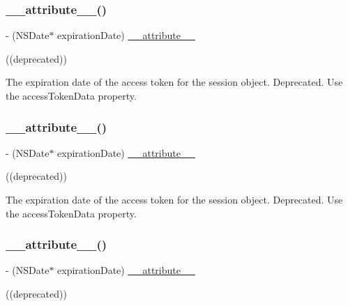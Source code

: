 \subsubsection{\texorpdfstring{\+\_\+\+\_\+attribute\+\_\+\+\_\+()}{\_\_attribute\_\_()}\hspace{0.1cm}{\footnotesize\ttfamily [8/25]}}
{\footnotesize\ttfamily -\/ (N\+S\+Date$\ast$ expiration\+Date) \hyperlink{struct____attribute____}{\+\_\+\+\_\+attribute\+\_\+\+\_\+} \begin{DoxyParamCaption}\item[{((deprecated))}]{ }\end{DoxyParamCaption}}

The expiration date of the access token for the session object.  Deprecated. Use the {\ttfamily access\+Token\+Data} property. \mbox{\label{interfaceFBSession_a42e6a02db4caa8197e8fc851bc18f1e1}} 
\subsubsection{\texorpdfstring{\+\_\+\+\_\+attribute\+\_\+\+\_\+()}{\_\_attribute\_\_()}\hspace{0.1cm}{\footnotesize\ttfamily [9/25]}}
{\footnotesize\ttfamily -\/ (N\+S\+Date$\ast$ expiration\+Date) \hyperlink{struct____attribute____}{\+\_\+\+\_\+attribute\+\_\+\+\_\+} \begin{DoxyParamCaption}\item[{((deprecated))}]{ }\end{DoxyParamCaption}}

The expiration date of the access token for the session object.  Deprecated. Use the {\ttfamily access\+Token\+Data} property. \mbox{\label{interfaceFBSession_a42e6a02db4caa8197e8fc851bc18f1e1}} 
\subsubsection{\texorpdfstring{\+\_\+\+\_\+attribute\+\_\+\+\_\+()}{\_\_attribute\_\_()}\hspace{0.1cm}{\footnotesize\ttfamily [10/25]}}
{\footnotesize\ttfamily -\/ (N\+S\+Date$\ast$ expiration\+Date) \hyperlink{struct____attribute____}{\+\_\+\+\_\+attribute\+\_\+\+\_\+} \begin{DoxyParamCaption}\item[{((deprecated))}]{ }\end{DoxyParamCaption}}

